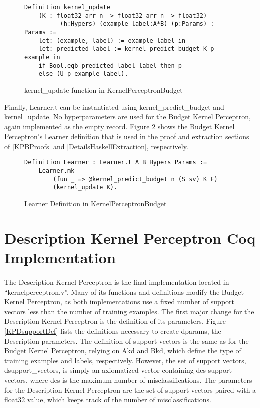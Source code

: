 \begin{figure}
    \caption{kernel\_update function in KernelPerceptronBudget}
    \label{kernel_update_budgetDef}
    \begin{lstlisting}
Definition kernel_update 
    (K : float32_arr n -> float32_arr n -> float32)
          (h:Hypers) (example_label:A*B) (p:Params) : Params :=
    let: (example, label) := example_label in 
    let: predicted_label := kernel_predict_budget K p example in
    if Bool.eqb predicted_label label then p
    else (U p example_label).
    \end{lstlisting}
\end{figure}

Finally, Learner.t can be instantiated using kernel\_predict\_budget and kernel\_update. No hyperparameters are used for the Budget Kernel Perceptron, again implemented as the empty record. Figure \ref{kpbLearnerDef} shows the Budget Kernel Perceptron's Learner definition that is used in the proof and extraction sections of \ref{KPBProofs} and \ref{DetailsHaskellExtraction}, respectively.

\begin{figure}
    \caption{Learner Definition in KernelPerceptronBudget}
    \label{kpbLearnerDef}
    \begin{lstlisting}
Definition Learner : Learner.t A B Hypers Params :=
    Learner.mk
        (fun _ => @kernel_predict_budget n (S sv) K F)
        (kernel_update K).
    \end{lstlisting}
\end{figure}

\section{Description Kernel Perceptron Coq Implementation}\label{KPDCoqImp}

The Description Kernel Perceptron is the final implementation located in ``kernelperceptron.v''. Many of its functions and definitions modify the Budget Kernel Perceptron, as both implementations use a fixed number of support vectors less than the number of training examples. The first major change for the Description Kernel Perceptron is the definition of its parameters. Figure \ref{KPDsupportDef} lists the definitions necessary to create dparams, the Description parameters. The definition of support vectors is the same as for the Budget Kernel Perceptron, relying on Akd and Bkd, which define the type of training examples and labels, respectively. However, the set of support vectors, dsupport\_vectors, is simply an axiomatized vector containing des support vectors, where des is the maximum number of misclassifications. The parameters for the Description Kernel Perceptron are the set of support vectors paired with a float32 value, which keeps track of the number of misclassifications.

